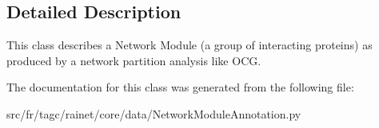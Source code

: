 \subsection{Detailed Description}
This class describes a Network Module (a group of interacting proteins) as produced by a network partition analysis like O\-C\-G. 

The documentation for this class was generated from the following file\-:\begin{DoxyCompactItemize}
\item 
src/fr/tagc/rainet/core/data/Network\-Module\-Annotation.\-py\end{DoxyCompactItemize}
